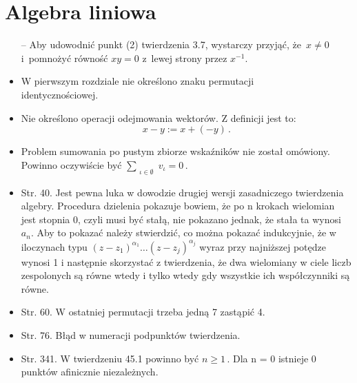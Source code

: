 \documentclass[a4paper,11pt]{article}
\begin{document}
\vspace{\spaceTwo}





\newpage
\section{Algebra liniowa}

\vspace{\spaceTwo}





\begin{itemize}
\item[--]  Aby udowodnić punkt (2) twierdzenia 3.7, wystarczy
  przyjąć, że~$x \neq 0$ i~pomnożyć równość $xy = 0$ z~lewej strony
  przez $x^{ -1 }$.
\item W pierwszym rozdziale nie określono znaku permutacji
  \\identycznościowej.
\item Nie określono operacji odejmowania wektorów. Z definicji jest
  to:$$x - y := x + ( -y ) \, .$$
\item Problem sumowania po pustym zbiorze wskaźników nie został
  omówiony. Powinno oczywiście być
  $\sum_{ \substack{ \iota \in \emptyset } } v_{ \iota } = 0 \, .$
\item Str. 40. Jest pewna luka w dowodzie drugiej wersji zasadniczego
  twierdzenia algebry. Procedura dzielenia pokazuje bowiem, że po n
  krokach wielomian jest stopnia 0, czyli musi być stałą, nie pokazano
  jednak, że stała ta wynosi $a_{ n }$. Aby to pokazać należy
  stwierdzić, co można pokazać indukcyjnie, że w iloczynach typu
  $( z - z_{ 1 } )^{ \alpha_{ 1 } } \ldots( z - z_{ j } )^{ \alpha_{ j
    } }$ wyraz przy najniższej potędze wynosi 1 i następnie skorzystać
  z twierdzenia, że dwa wielomiany w ciele liczb zespolonych są równe
  wtedy i tylko wtedy gdy wszystkie ich współczynniki są równe.
\item Str. 60. W ostatniej permutacji trzeba jedną 7 zastąpić 4.
\item Str. 76. Błąd w numeracji podpunktów twierdzenia.
\item Str. 341. W twierdzeniu 45.1 powinno być $n \geq 1 \, .$ Dla n =
  0 istnieje 0 punktów afinicznie niezależnych.
\end{itemize}
\end{document}
